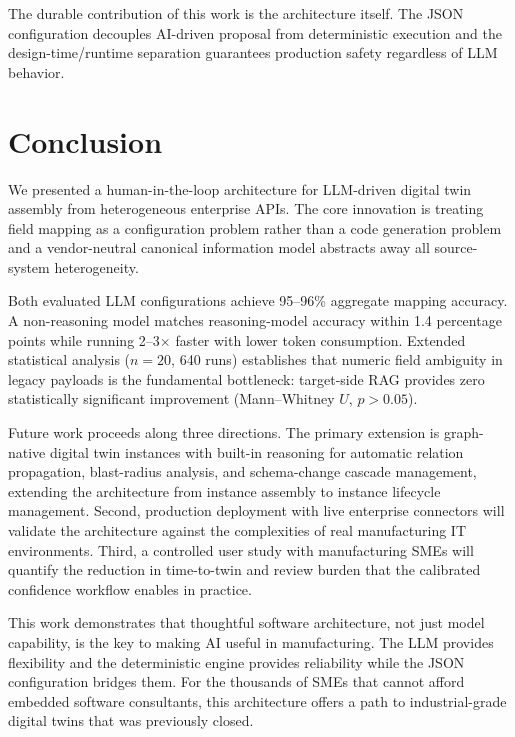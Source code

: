 \documentclass[3p,times,procedia]{elsarticle}
\begin{document}
The durable contribution of this work is the architecture itself. The JSON configuration decouples AI-driven proposal from deterministic execution and the design-time/runtime separation guarantees production safety regardless of LLM behavior.

\section{Conclusion}
\label{sec:conclusion}

We presented a human-in-the-loop architecture for LLM-driven digital twin assembly from heterogeneous enterprise APIs. The core innovation is treating field mapping as a configuration problem rather than a code generation problem and a vendor-neutral canonical information model abstracts away all source-system heterogeneity.

Both evaluated LLM configurations achieve 95--96\% aggregate mapping accuracy. A non-reasoning model matches reasoning-model accuracy within 1.4 percentage points while running 2--3$\times$ faster with lower token consumption. Extended statistical analysis ($n = 20$, 640 runs) establishes that numeric field ambiguity in legacy payloads is the fundamental bottleneck: target-side RAG provides zero statistically significant improvement (Mann--Whitney $U$, $p > 0.05$).

Future work proceeds along three directions. The primary extension is graph-native digital twin instances with built-in reasoning for automatic relation propagation, blast-radius analysis, and schema-change cascade management, extending the architecture from instance assembly to instance lifecycle management. Second, production deployment with live enterprise connectors will validate the architecture against the complexities of real manufacturing IT environments. Third, a controlled user study with manufacturing SMEs will quantify the reduction in time-to-twin and review burden that the calibrated confidence workflow enables in practice.

This work demonstrates that thoughtful software architecture, not just model capability, is the key to making AI useful in manufacturing. The LLM provides flexibility and the deterministic engine provides reliability while the JSON configuration bridges them. For the thousands of SMEs that cannot afford embedded software consultants, this architecture offers a path to industrial-grade digital twins that was previously closed.




\end{document}
